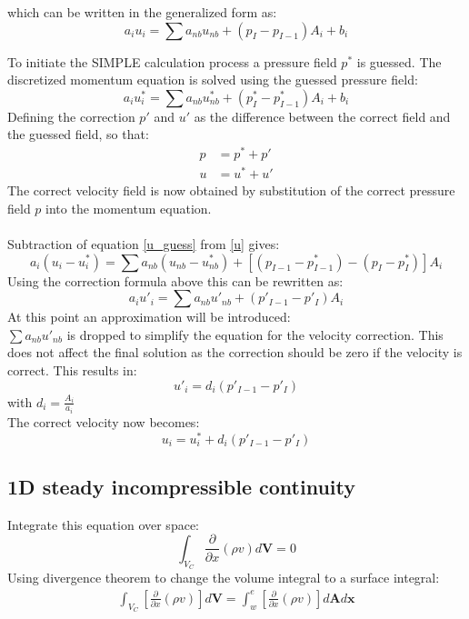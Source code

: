 which can be written in the generalized form as:
\begin{equation}
a_i u_i = \sum a_{nb} u_{nb} + (p_I - p_{I-1})A_i + b_i
\label{u}
\end{equation}

To initiate the SIMPLE calculation process a pressure field $p^*$ is guessed. The discretized momentum equation is solved using the guessed pressure field:
\begin{equation}
a_iu^*_i = \sum a_{nb} u^*_{nb} + (p^*_I - p^*_{I-1})A_i + b_i
\label{u_guess}
\end{equation}
Defining the correction $p'$ and $u'$ as the difference between the correct field and the guessed field, so that:
\begin{align}
	p &= p^* + p' \nonumber \\
	u &= u^* +u' \nonumber
\end{align}
\newpage 
The correct velocity field is now obtained by substitution of the correct pressure field $p$ into the momentum equation. \\ \\
Subtraction of equation \ref{u_guess} from \ref{u} gives:
\begin{equation}
a_i(u_i - u^*_i ) = \sum a_{nb} (u_{nb} - u^*_{nb}) + [(p_{I-1} - p^*_{I-1}) - (p_I -p^*_I )]A_i
\end{equation}
Using the correction formula above this can be rewritten as:
\begin{equation}
a_iu'_i = \sum a_{nb} u'_{nb} + (p'_{I-1}  - p'_I )A_i
\end{equation}
At this point an approximation will be introduced:\\ $\sum a_{nb} u'_{nb}$ is dropped to simplify the equation for the velocity correction. This does not affect the final solution as the correction should be zero if the velocity is correct. This results in:
\begin{equation}
u'_i = d_i(p'_{I-1}  - p'_I )
\end{equation}
with $d_i = \frac{A_i}{a_i}$ \\
The correct velocity now becomes:
\begin{equation}
	u_i = u^*_i + d_i(p'_{I-1}  - p'_I )
\end{equation}
\subsection{1D steady incompressible continuity}
Integrate this equation over space:
\begin{equation}
	\int_{V_C} \frac{\partial}{\partial x} (\rho v)d\boldsymbol{V} = 0
\end{equation}
Using divergence theorem to change the volume integral to a surface integral:
\begin{align}
	\int_{V_C} \left[ \frac{\partial}{\partial x} (\rho v)\right]d\boldsymbol{V} =\int_{w}^{e} \left[ \frac{\partial}{\partial x} (\rho v)\right]d\boldsymbol{A}d\boldsymbol{x}
\end{align}


